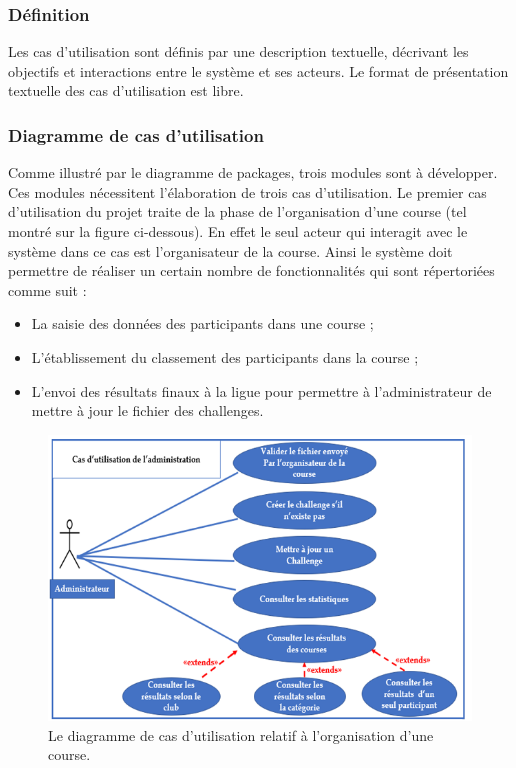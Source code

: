 \documentclass[12pt,a4paper]{report}
\begin{document}
\subsubsection{Définition}
Les cas d'utilisation sont définis par une description textuelle, décrivant les objectifs et interactions entre le système et ses acteurs. Le format de présentation textuelle des cas d'utilisation est libre.
\subsubsection{Diagramme de cas d’utilisation }
Comme illustré par le diagramme de packages, trois modules sont à développer. Ces modules nécessitent l’élaboration de trois cas d’utilisation. Le premier cas d’utilisation du projet traite de la phase de l’organisation d’une course (tel montré sur la figure ci-dessous). En effet le seul acteur qui interagit avec le système dans ce cas est l’organisateur de la course. Ainsi le système doit permettre de réaliser un certain nombre de fonctionnalités qui sont répertoriées comme suit :
\begin{itemize} 
\item La saisie des données des participants dans une course ;
\item  L’établissement du classement des participants dans la course ;
\item  L’envoi des résultats finaux à la ligue pour permettre à l’administrateur de mettre à jour le fichier des challenges.
\end{itemize} 

\begin{figure}
	   \center
	   \includegraphics[scale=0.5]{Diagramme_cas_utilisation_organisation_course.png}
	   \caption {Le diagramme de cas d’utilisation relatif à l’organisation d’une course.}
\end{figure}
\end{document}
